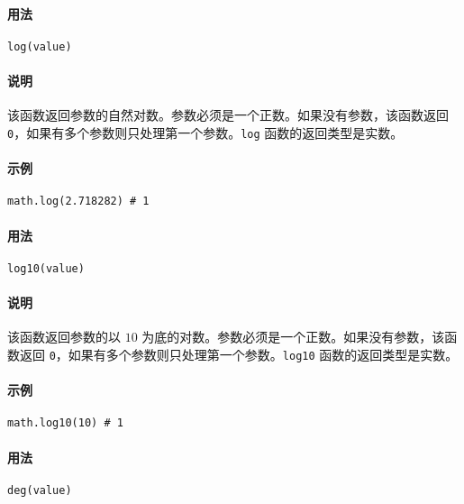 \paragraph{用法}
\begin{lstlisting}[language=berry, numbers=none]
log(value)
\end{lstlisting}

\paragraph{说明}
该函数返回参数的自然对数。参数必须是一个正数。如果没有参数，该函数返回 \texttt{0}，如果有多个参数则只处理第一个参数。\texttt{log} 函数的返回类型是实数。

\paragraph{示例}
\begin{lstlisting}[language=berry, numbers=none]
math.log(2.718282) # 1
\end{lstlisting}


\paragraph{用法}
\begin{lstlisting}[language=berry, numbers=none]
log10(value)
\end{lstlisting}

\paragraph{说明}
该函数返回参数的以 $10$ 为底的对数。参数必须是一个正数。如果没有参数，该函数返回 \texttt{0}，如果有多个参数则只处理第一个参数。\texttt{log10} 函数的返回类型是实数。

\paragraph{示例}
\begin{lstlisting}[language=berry, numbers=none]
math.log10(10) # 1
\end{lstlisting}


\paragraph{用法}
\begin{lstlisting}[language=berry, numbers=none]
deg(value)
\end{lstlisting}

